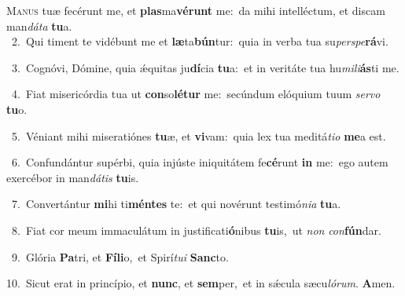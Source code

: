 \lettrine{\initial\textcolor{\initialcolor}{M}}{anus} tuæ fecérunt me, et \textbf{plas}\-ma\-\textbf{vé}\-\textbf{runt} me:~\star da mihi intelléctum, et discam man\-\textit{dá}\-\textit{ta} \textbf{tu}\-a.\\
{\numbfont\textcolor{\numbcolor}{~2.}}~Qui timent te vidébunt me et \textbf{læ}\-ta\-\textbf{bún}\-tur:~\star quia in verba tua su\-\textit{per}\-\textit{spe}\textbf{rá}vi.\par
{\numbfont\textcolor{\numbcolor}{~3.}}~Cognóvi, Dómine, quia ǽquitas ju\-\textbf{dí}\-cia \textbf{tu}\-a:~\star et in veritáte tua hu\-\textit{mi}\-\textit{li}\textbf{ás}ti me.\par
{\numbfont\textcolor{\numbcolor}{~4.}}~Fiat misericórdia tua ut \textbf{con}\-so\-\textbf{lé}\-\textbf{tur} me:~\star secúndum elóquium tuum \textit{ser}\-\textit{vo} \textbf{tu}\-o.\par
{\numbfont\textcolor{\numbcolor}{~5.}}~Véniant mihi miseratiónes \textbf{tu}\-æ, et \textbf{vi}\-vam:~\star quia lex tua meditá\-\textit{ti}\-\textit{o} \textbf{me}\-a est.\par
{\numbfont\textcolor{\numbcolor}{~6.}}~Confundántur supérbi, quia injúste iniquitátem fe\-\textbf{cé}\-runt \textbf{in} me:~\star ego autem exercébor in man\-\textit{dá}\-\textit{tis} \textbf{tu}\-is.\par
{\numbfont\textcolor{\numbcolor}{~7.}}~Convertántur \textbf{mi}\-hi ti\-\textbf{mén}\-\textbf{tes} te:~\star et qui novérunt testimó\-\textit{ni}\-\textit{a} \textbf{tu}\-a.\par
{\numbfont\textcolor{\numbcolor}{~8.}}~Fiat cor meum immaculátum in justificati\-\textbf{ó}\-nibus \textbf{tu}\-is,~\star ut \textit{non} \textit{con}\-\textbf{fún}dar.\par
{\numbfont\textcolor{\numbcolor}{~9.}}~Glória \textbf{Pa}\-tri, et \textbf{Fí}\-\textbf{li}o,~\star et Spirí\-\textit{tu}\-\textit{i} \textbf{Sanc}\-to.\par
{\numbfont\textcolor{\numbcolor}{10.}}~Sicut erat in princípio, et \textbf{nunc}\-, et \textbf{sem}\-per,~\star et in sǽcula sæcu\-\textit{ló}\-\textit{rum}. \textbf{A}\-men.\par
